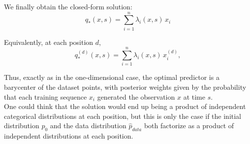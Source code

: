 \documentclass{article}
\begin{document}
We finally obtain the closed-form solution:
\begin{equation}
\boxed{
    q_*(x,s)
    =
    \sum_{i=1}^{n} \lambda_i(x,s)\, x_i
}
\end{equation}

Equivalently, at each position $d$,
\begin{equation}
    q_*^{(d)}(x,s)
    =
    \sum_{i=1}^{n} \lambda_i(x,s)\, x_i^{(d)},
\end{equation}

Thus, exactly as in the one-dimensional case, the optimal predictor is a barycenter of the dataset points, with posterior weights given by the probability that each training sequence $x_i$ generated the observation $x$ at time $s$.\\
One could think that the solution would end up being a product of independent categorical distributions at each position, but this is only the case if the initial distribution $p_0$ and the data distribution $\hat{p}_{data}$ both factorize as a product of independent distributions at each position.
\end{document}
